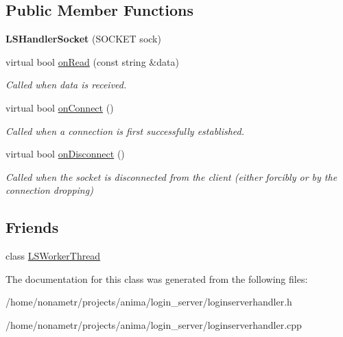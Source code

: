 \subsection*{Public Member Functions}
\begin{DoxyCompactItemize}
\item 
\hypertarget{classLSHandlerSocket_ad8daab5be80137d7aa134a969b49daa9}{
{\bfseries LSHandlerSocket} (SOCKET sock)}
\label{classLSHandlerSocket_ad8daab5be80137d7aa134a969b49daa9}

\item 
\hypertarget{classLSHandlerSocket_a7f1f666e7f40800bc3db220ccc8f9dde}{
virtual bool \hyperlink{classLSHandlerSocket_a7f1f666e7f40800bc3db220ccc8f9dde}{onRead} (const string \&data)}
\label{classLSHandlerSocket_a7f1f666e7f40800bc3db220ccc8f9dde}

\begin{DoxyCompactList}\small\item\em Called when data is received. \item\end{DoxyCompactList}\item 
\hypertarget{classLSHandlerSocket_ae8c2d599c4582bec260f250eaf003560}{
virtual bool \hyperlink{classLSHandlerSocket_ae8c2d599c4582bec260f250eaf003560}{onConnect} ()}
\label{classLSHandlerSocket_ae8c2d599c4582bec260f250eaf003560}

\begin{DoxyCompactList}\small\item\em Called when a connection is first successfully established. \item\end{DoxyCompactList}\item 
\hypertarget{classLSHandlerSocket_afde87524561ae2b3307fbe8eb3edeecd}{
virtual bool \hyperlink{classLSHandlerSocket_afde87524561ae2b3307fbe8eb3edeecd}{onDisconnect} ()}
\label{classLSHandlerSocket_afde87524561ae2b3307fbe8eb3edeecd}

\begin{DoxyCompactList}\small\item\em Called when the socket is disconnected from the client (either forcibly or by the connection dropping) \item\end{DoxyCompactList}\end{DoxyCompactItemize}
\subsection*{Friends}
\begin{DoxyCompactItemize}
\item 
\hypertarget{classLSHandlerSocket_aef5acff34893c2cdf0dc9d1a35278a51}{
class \hyperlink{classLSHandlerSocket_aef5acff34893c2cdf0dc9d1a35278a51}{LSWorkerThread}}
\label{classLSHandlerSocket_aef5acff34893c2cdf0dc9d1a35278a51}

\end{DoxyCompactItemize}


The documentation for this class was generated from the following files:\begin{DoxyCompactItemize}
\item 
/home/nonametr/projects/anima/login\_\-server/loginserverhandler.h\item 
/home/nonametr/projects/anima/login\_\-server/loginserverhandler.cpp\end{DoxyCompactItemize}
